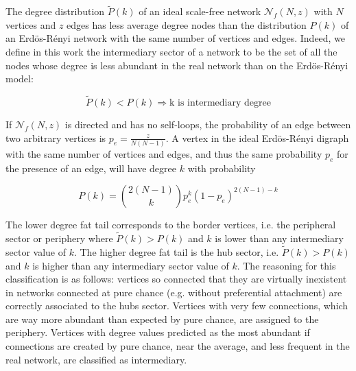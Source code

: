 \documentclass[%
	aip,
	jmp,%
	amsmath,amssymb,
	reprint,%
]{revtex4-1}
\begin{document}
The degree distribution $\widetilde{P}(k)$ of an ideal
scale-free network $\mathcal{N}_f(N,z)$ with $N$ vertices and $z$ edges has less
average degree nodes than the distribution $P(k)$ of an Erd\"os-R\'enyi
network with the same number of vertices and edges. Indeed, we define in this work the intermediary sector of a network to be the set of all the nodes whose degree is less abundant in the real network than on the Erd\"os-R\'enyi model:

\begin{equation}\label{criterio}
	\widetilde{P}(k)<P(k) \Rightarrow \text{k is intermediary degree}
\end{equation}

If $\mathcal{N}_f(N,z)$ is directed and has no self-loops, the probability
of an edge between two arbitrary vertices is $p_e=\frac{z}{N(N-1)}$.
A vertex in the ideal Erd\"os-R\'enyi digraph with the same number of vertices and edges, and thus the same probability $p_e$ for the presence of an edge, will have degree $k$ with probability

\begin{equation}
	P(k)=\binom{2(N-1)}{k}p_e^k(1-p_e)^{2(N-1)-k}
\end{equation}

The lower degree fat tail corresponds to the border vertices, i.e. the peripheral sector or periphery where $\widetilde{P}(k)>P(k)$ and $k$ is lower than any intermediary sector value of $k$. The higher degree fat tail is the hub sector, i.e. $\widetilde{P}(k)>P(k)$ and $k$ is higher than any intermediary sector value of $k$. The reasoning for this classification is as follows: vertices so connected that they are virtually inexistent in networks connected at pure chance (e.g. without preferential attachment) are correctly associated to the hubs sector. Vertices with very few connections, which are way more abundant than expected by pure chance, are assigned to the periphery. Vertices with degree values predicted as the most abundant if connections are created by pure chance, near the average, and less frequent in the real network, are classified as intermediary.
\end{document}
